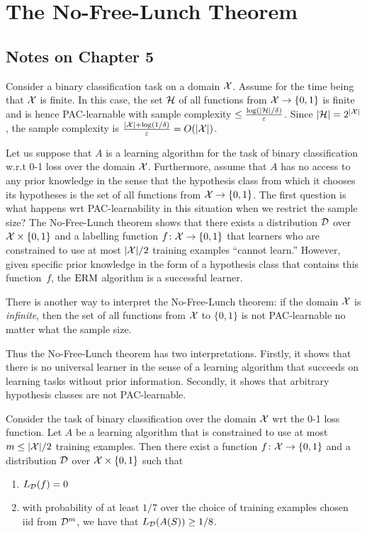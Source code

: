 \chapter{The No-Free-Lunch Theorem}

\section*{Notes on Chapter 5}

Consider a binary classification task on a domain $\mathcal{X}$. Assume for the time
being that $\mathcal{X}$ is finite. In this case, the set $\mathcal{H}$ of all functions
from $\mathcal{X} \rightarrow \{0, 1\}$ is finite and is hence PAC-learnable with
sample complexity $\leq \frac{\log (|\mathcal{H}| / \delta)}{\varepsilon}$.  Since
$|\mathcal{H}| = 2^{|\mathcal{X}|}$, the sample complexity is $\frac{|\mathcal{X}| + \log (1 /
\delta)}{\varepsilon} = O(|\mathcal{X}|)$.

Let us suppose that $A$ is a learning algorithm for the task of binary
classification w.r.t 0-1 loss over the domain $\mathcal{X}$. Furthermore, assume
that $A$ has no access to any prior knowledge in the sense that the hypothesis
class from which it chooses its hypotheses is the set of all functions from
$\mathcal{X} \rightarrow \{0, 1\}$.
The first question is what happens wrt PAC-learnability in this situation when
we restrict the sample size? The No-Free-Lunch theorem shows that there exists
a distribution $\mathcal{D}$ over $\mathcal{X} \times \{0, 1\}$ and a labelling function $f
\colon \mathcal{X} \rightarrow \{0, 1\}$ that learners who are  constrained to use at
most $|\mathcal{X}| / 2$ training examples ``cannot learn.'' However, given specific prior
knowledge in the form of a hypothesis class that contains this function~$f$, the
$\operatorname{ERM}$ algorithm is a successful learner.


There is another way to interpret the No-Free-Lunch theorem: if the domain
$\mathcal{X}$ is \emph{infinite}, then the set of all functions from $\mathcal{X}$ to
$\{0, 1\}$ is not PAC-learnable no matter what the sample size.

Thus the No-Free-Lunch theorem has two interpretations. Firstly, it shows that there
is no universal learner in the sense of a learning algorithm that succeeds on
learning tasks without prior information. Secondly, it shows that arbitrary hypothesis
classes are not PAC-learnable.


\begin{theorem}
\label{thm:no_free_lunch}
Consider the task of binary classification over the domain $\mathcal{X}$ wrt the 0-1
loss function. Let $A$ be a learning algorithm that is constrained to use at
most $m \leq |\mathcal{X}| / 2$ training examples. Then there exist
a function $f \colon \mathcal{X} \rightarrow \{0, 1\}$ and a distribution
$\mathcal{D}$ over $\mathcal{X} \times \{0, 1\}$ such that
\begin{enumerate}
    \item $L_{\mathcal{D}} (f) = 0$
    \item with probability of at least $1/7$ over the choice of training examples
        chosen iid from $\mathcal{D}^{m}$, we have that $L_{\mathcal{D}} (A(S)) \geq 1/ 8$.
\end{enumerate}
\end{theorem}


